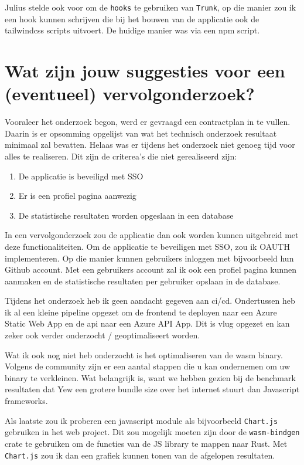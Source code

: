 Julius stelde ook voor om de \texttt{hooks} te gebruiken van \texttt{Trunk}, op
die manier zou ik een hook kunnen schrijven die bij het bouwen van de applicatie ook de tailwindcss
scripts uitvoert. De huidige manier was via een npm script.

\section{Wat zijn jouw suggesties voor een (eventueel) vervolgonderzoek?}

Vooraleer het onderzoek begon, werd er gevraagd een contractplan in te vullen. Daarin is er
opsomming opgelijst van wat het technisch onderzoek resultaat minimaal zal bevatten. Helaas was er
tijdens het onderzoek niet genoeg tijd voor alles te realiseren. Dit zijn de criterea's die niet
gerealiseerd zijn:
\begin{enumerate}
  \item De applicatie is beveiligd met SSO
  \item Er is een profiel pagina aanwezig
  \item De statistische resultaten worden opgeslaan in een database
\end{enumerate}
In een vervolgonderzoek zou de applicatie dan ook worden kunnen uitgebreid met deze
functionaliteiten. Om de applicatie te beveiligen met SSO, zou ik OAUTH implementeren. Op die manier
kunnen gebruikers inloggen met bijvoorbeeld hun Github account.  Met een gebruikers account zal ik
ook een profiel pagina kunnen aanmaken en de statistische resultaten per gebruiker opslaan in de
database.

Tijdens het onderzoek heb ik geen aandacht gegeven aan ci/cd. Ondertussen heb ik al een kleine
pipeline opgezet om de frontend te deployen naar een Azure Static Web App en de api naar een Azure
API App. Dit is vlug opgezet en kan zeker ook verder onderzocht / geoptimaliseert worden.

Wat ik ook nog niet heb onderzocht is het optimaliseren van de wasm binary.\cite{wasm_size} Volgens
de community zijn er een aantal stappen die u kan ondernemen om uw binary te verkleinen. Wat
belangrijk is, want we hebben gezien bij de benchmark resultaten dat Yew een grotere bundle size
over het internet stuurt dan Javascript frameworks.

Als laatste zou ik proberen een javascript module als bijvoorbeeld \texttt{Chart.js}
gebruiken in het web project. Dit zou mogelijk moeten zijn door de \texttt{wasm-bindgen}
crate te gebruiken om de functies van de JS library te mappen naar Rust. Met
\texttt{Chart.js} zou ik dan een grafiek kunnen tonen van de afgelopen resultaten.
